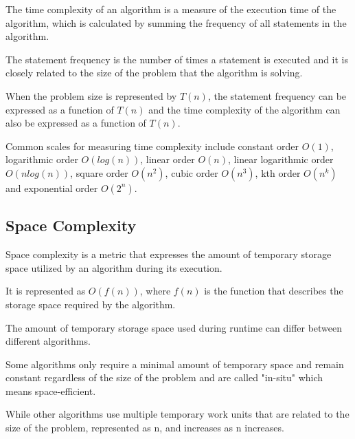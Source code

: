 \documentclass[bibliography=totoc]{scrartcl}
\begin{document}
The time complexity of an algorithm is a measure of the execution time of the algorithm, which is calculated by summing the frequency of all statements in the algorithm. 



The statement frequency is the number of times a statement is executed and it is closely related to the size of the problem that the algorithm is solving. 



When the problem size is represented by $T(n)$, the statement frequency can be expressed as a function of $T(n)$ and the time complexity of the algorithm can also be expressed as a function of $T(n)$. \cite[p. 248 l. 22 ]{TheoryComputation}



Common scales for measuring time complexity include constant order $O(1)$, logarithmic order $O(log(n))$, linear order $O(n)$, linear logarithmic order $O(nlog(n))$, square order $O(n^2)$, cubic order $O(n^3)$, kth order $O(n^k)$ and exponential order $O(2^n)$.







\subsection{Space Complexity}



Space complexity is a metric that expresses the amount of temporary storage space utilized by an algorithm during its execution. 



It is represented as $O(f(n))$, where $f(n)$ is the function that describes the storage space required by the algorithm. \cite[p. 303]{TheoryComputation}



The amount of temporary storage space used during runtime can differ between different algorithms. 



Some algorithms only require a minimal amount of temporary space and remain constant regardless of the size of the problem and are called "in-situ" which means space-efficient. 



While other algorithms use multiple temporary work units that are related to the size of the problem, represented as n, and increases as n increases. 
\end{document}
